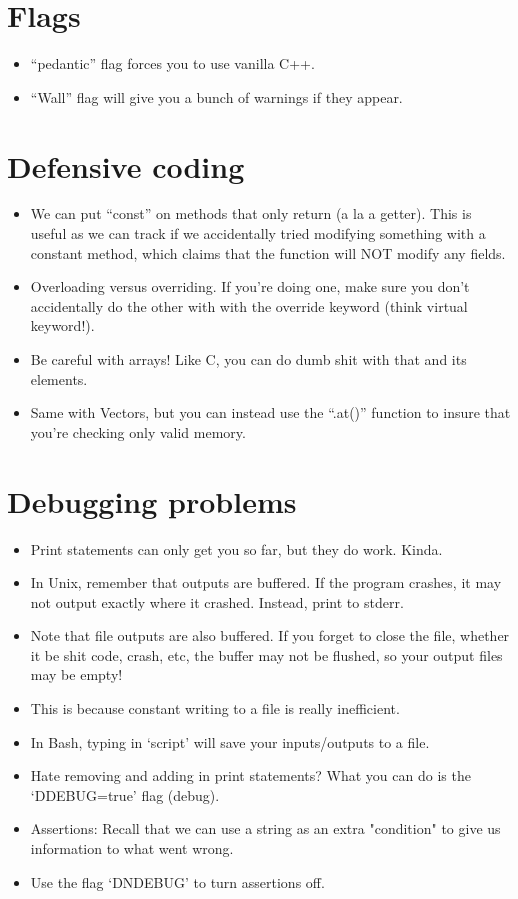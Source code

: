 \documentclass{article}
\author{Clement Tsang}
\begin{document}
\section{Flags}
\begin{itemize}
\item ``pedantic'' flag forces you to use vanilla C++.
\item ``Wall'' flag will give you a bunch of warnings if they appear.
\end{itemize}

\section{Defensive coding}
\begin{itemize}
\item We can put ``const'' on methods that only return (a la a getter).  This is useful as we can track if we accidentally tried modifying something with a constant method, which claims that the function will NOT modify any fields.
\item Overloading versus overriding.  If you're doing one, make sure you don't accidentally do the other with with the override keyword (think virtual keyword!).
\item Be careful with arrays!  Like C, you can do dumb shit with that and its elements.
\item Same with Vectors, but you can instead use the ``.at()'' function to insure that you're checking only valid memory.
\end{itemize}

\section{Debugging problems}
\begin{itemize}
\item Print statements can only get you so far, but they do work.  Kinda.
\item In Unix, remember that outputs are buffered.  If the program crashes, it may not output exactly where it crashed.  Instead, print to stderr.
\item Note that file outputs are also buffered.  If you forget to close the file, whether it be shit code, crash, etc, the buffer may not be flushed, so your output files may be empty!
\item This is because constant writing to a file is really inefficient.
\item In Bash, typing in `script' will save your inputs/outputs to a file.
\item Hate removing and adding in print statements?  What you can do is the `DDEBUG=true' flag (debug).
\item Assertions:  Recall that we can use a string as an extra "condition" to give us information to what went wrong.
\item Use the flag `DNDEBUG' to turn assertions off.
\end{itemize}
\end{document}

